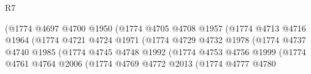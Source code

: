 \begin{lexlean}{R7}
\begin{coremodule}
                                            (@1774
                                              @4697
                                              @4700
                                              @1950
                                              (@1774
                                                @4705
                                                @4708
                                                @1957
                                                (@1774
                                                  @4713
                                                  @4716
                                                  @1964
                                                  (@1774
                                                    @4721
                                                    @4724
                                                    @1971
                                                    (@1774
                                                      @4729
                                                      @4732
                                                      @1978
                                                      (@1774
                                                        @4737
                                                        @4740
                                                        @1985
                                                        (@1774
                                                          @4745
                                                          @4748
                                                          @1992
                                                          (@1774
                                                            @4753
                                                            @4756
                                                            @1999
                                                            (@1774
                                                              @4761
                                                              @4764
                                                              @2006
                                                              (@1774
                                                                @4769
                                                                @4772
                                                                @2013
                                                                (@1774
                                                                  @4777
                                                                  @4780

\end{coremodule}
\end{lexlean}
